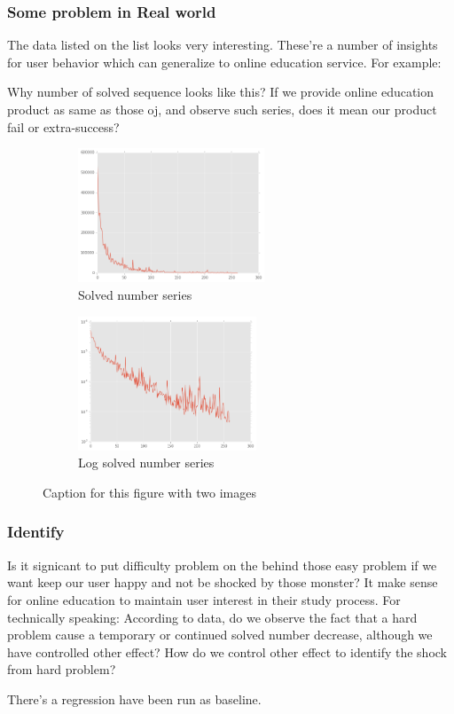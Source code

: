 \documentclass{beamer}
\begin{document}
\begin{frame}
\frametitle{Some problem in Real world}

The data listed on the list looks very interesting. These're a number of insights for user behavior which 
can generalize to online education service. For example:

Why number of solved sequence looks like this? If we provide online education product as same as those oj, 
and observe such series, does it mean our product fail or extra-success?

\begin{figure}[h]
 
\begin{subfigure}{0.45\textwidth}
\includegraphics[width=0.9\linewidth, height=4cm]{solved-seq1.png} 
\caption{Solved number series}
\label{fig:f1}
\end{subfigure}
\begin{subfigure}{0.45\textwidth}
\includegraphics[width=0.9\linewidth, height=4cm]{solved-seq2.png}
\caption{Log solved number series}
\label{fig:f2}
\end{subfigure}
 
\caption{Caption for this figure with two images}
\label{fig:image2}
\end{figure}

\end{frame}

\begin{frame}

\frametitle{Identify}

Is it signicant to put difficulty problem on the behind those easy problem 
if we want keep our user happy and not be shocked by those monster? It make sense
for online education to maintain user interest in their study process. For technically speaking:
According to data, do we observe the fact that a hard problem cause a temporary 
or continued solved number decrease,
although we have controlled other effect? 
How do we control other effect to identify the shock from hard problem?

There's a regression have been run as baseline.

\end{frame}
\end{document}
